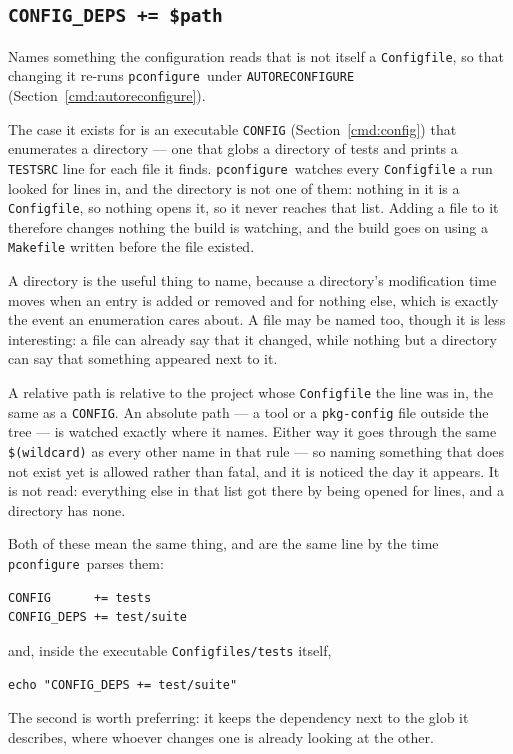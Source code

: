 \documentclass{article}
\newcommand{\pconfigure}{\texttt{pconfigure}}
\begin{document}
\subsection{\texttt{CONFIG\_DEPS += \$path} \label{cmd:config_deps}}

Names something the configuration reads that is not itself a
\texttt{Configfile}, so that changing it re-runs \pconfigure\ under
\texttt{AUTORECONFIGURE} (Section~\ref{cmd:autoreconfigure}).

The case it exists for is an executable \texttt{CONFIG}
(Section~\ref{cmd:config}) that enumerates a directory --- one that
globs a directory of tests and prints a \texttt{TESTSRC} line for each
file it finds.  \pconfigure\ watches every \texttt{Configfile} a run
looked for lines in, and the directory is not one of them: nothing in
it is a \texttt{Configfile}, so nothing opens it, so it never reaches
that list.  Adding a file to it therefore changes nothing the build is
watching, and the build goes on using a \texttt{Makefile} written
before the file existed.

A directory is the useful thing to name, because a directory's
modification time moves when an entry is added or removed and for
nothing else, which is exactly the event an enumeration cares about.  A
file may be named too, though it is less interesting: a file can
already say that it changed, while nothing but a directory can say
that something appeared next to it.

A relative path is relative to the project whose \texttt{Configfile}
the line was in, the same as a \texttt{CONFIG}.  An absolute path ---
a tool or a \texttt{pkg-config} file outside the tree --- is watched
exactly where it names.  Either way it goes through the same
\texttt{\$(wildcard)} as every other name in that rule --- so naming
something that does not exist yet is allowed rather than fatal, and it
is noticed the day it appears.  It is not read: everything else in that
list got there by being opened for lines, and a directory has none.

Both of these mean the same thing, and are the same line by the time
\pconfigure\ parses them:
\begin{verbatim}
CONFIG      += tests
CONFIG_DEPS += test/suite
\end{verbatim}
and, inside the executable \texttt{Configfiles/tests} itself,
\begin{verbatim}
echo "CONFIG_DEPS += test/suite"
\end{verbatim}
The second is worth preferring: it keeps the dependency next to the
glob it describes, where whoever changes one is already looking at the
other.
\end{document}
